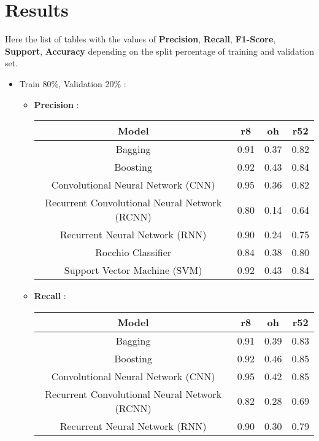 \section{Results}
Here the list of tables with the values of \textbf{Precision}, \textbf{Recall}, \textbf{F1-Score}, \textbf{Support}, \textbf{Accuracy} depending on the split percentage of training and validation set.


\begin{itemize}
    \item Train 80\%, Validation 20\% :
        \begin{itemize}
        \item \textbf{Precision} : 
            \newline
            \begin{tabular}{|c|c|c|c|}\hline
                Model & r8 & oh & r52 \\\hline
                Bagging & 0.91 & 0.37 & 0.82 \\\hline
                Boosting & 0.92 & 0.43 & 0.84 \\\hline
                Convolutional Neural Network (CNN) & 0.95 & 0.36 & 0.82 \\\hline
                Recurrent Convolutional Neural Network (RCNN) & 0.80 & 0.14 & 0.64 \\\hline
                Recurrent Neural Network (RNN) & 0.90 & 0.24 & 0.75 \\\hline
                Rocchio Classifier & 0.84 & 0.38 & 0.80 \\\hline
                Support Vector Machine (SVM) & 0.92 & 0.43 & 0.84 \\\hline
            \end{tabular}
        \item \textbf{Recall} :
            \newline
            \begin{tabular}{|c|c|c|c|}\hline
                Model & r8 & oh & r52 \\\hline
                Bagging & 0.91 & 0.39 & 0.83 \\\hline
                Boosting & 0.92 & 0.46 & 0.85 \\\hline
                Convolutional Neural Network (CNN) & 0.95 & 0.42 & 0.85 \\\hline
                Recurrent Convolutional Neural Network (RCNN) & 0.82 & 0.28 & 0.69 \\\hline
                Recurrent Neural Network (RNN) & 0.90 & 0.30 & 0.79 \\\hline

\end{tabular}
\end{itemize}
\end{itemize}
